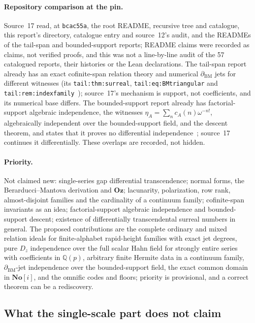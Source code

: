 \documentclass[11pt]{article}
\numberwithin{equation}{section}
\theoremstyle{definition}
\theoremstyle{remark}
\newcommand{\Q}{\mathbb Q}
\newcommand{\No}{\mathbf{No}}
\newcommand{\Oz}{\mathbf{Oz}}
\begin{document}
\paragraph{Repository comparison at the pin.}
Source~17 read, at \texttt{bcac55a}, the root README, recursive tree and
catalogue, this report's directory, catalogue entry and source~12's audit, and
the READMEs of the tail-span and bounded-support reports; README claims were
recorded as claims, not verified proofs, and this was not a line-by-line audit
of the 57 catalogued reports, their histories or the Lean declarations. The
tail-span report already has an exact cofinite-span relation theory and
numerical $\partial_{\mathrm{BM}}$ jets for different witnesses (its
\texttt{tail:thm:surreal}, \texttt{tail:eq:BMtriangular} and
\texttt{tail:rem:indexfamily}~\cite{repotail}); source~17's mechanism is
support, not coefficients, and its numerical base differs. The
bounded-support report already has factorial-support algebraic independence,
the witnesses $\eta_A=\sum_nc_A(n)\omega^{-n!}$, algebraically independent over
the bounded-support field, and the descent theorem, and states that it proves no differential
independence~\cite{repobst}; source~17 continues it differentially. These
overlaps are recorded, not hidden.

\paragraph{Priority.}
Not claimed new: single-series gap differential transcendence; normal forms,
the Berarducci--Mantova derivation and $\Oz$; lacunarity, polarization, row
rank, almost-disjoint families and the cardinality of a continuum family;
cofinite-span invariants as an idea; factorial-support algebraic independence
and bounded-support descent; existence of differentially transcendental
surreal numbers in general. The proposed contributions are the complete
ordinary and mixed relation ideals for finite-alphabet rapid-height families
with exact jet degrees, pure $D_z$ independence over the full scalar Hahn
field for strongly entire series with coefficients in $\Q(p)$, arbitrary
finite Hermite data in a continuum family, $\partial_{\mathrm{BM}}$-jet
independence over the bounded-support field, the exact common domain in
$\No[i]$, and the omnific codes and floors; priority is provisional, and a
correct theorem can be a rediscovery.

\subsection{What the single-scale part does not claim}
\label{hol:fh:sub:nonclaims}
\end{document}
